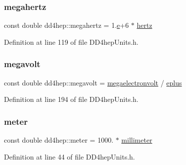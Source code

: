 \hypertarget{namespacedd4hep_a67e1a0f3e5d536a61c5b88820e284f6e}{}\label{namespacedd4hep_a67e1a0f3e5d536a61c5b88820e284f6e} 
\subsubsection{\texorpdfstring{megahertz}{megahertz}}
{\footnotesize\ttfamily const double dd4hep\+::megahertz = 1.\hyperlink{_volumes_8cpp_a8a9a1f93e9b09afccaec215310e64142}{e}+6 $\ast$ \hyperlink{namespacedd4hep_a5ada76b9ea37d13e1e346f2256017cff}{hertz}\hspace{0.3cm}{\ttfamily [static]}}



Definition at line 119 of file D\+D4hep\+Units.\+h.

\hypertarget{namespacedd4hep_a0899b6d1861ddc5f615d06209fb6a9fe}{}\label{namespacedd4hep_a0899b6d1861ddc5f615d06209fb6a9fe} 
\subsubsection{\texorpdfstring{megavolt}{megavolt}}
{\footnotesize\ttfamily const double dd4hep\+::megavolt = \hyperlink{namespacedd4hep_a4e39beba039f7a6bda24a7031c121b2a}{megaelectronvolt} / \hyperlink{namespacedd4hep_a96ccff254b6dcebf179c3630f6205857}{eplus}\hspace{0.3cm}{\ttfamily [static]}}



Definition at line 194 of file D\+D4hep\+Units.\+h.

\hypertarget{namespacedd4hep_a46f5cf0231796af4296a307a58812b06}{}\label{namespacedd4hep_a46f5cf0231796af4296a307a58812b06} 
\subsubsection{\texorpdfstring{meter}{meter}}
{\footnotesize\ttfamily const double dd4hep\+::meter = 1000. $\ast$ \hyperlink{namespacedd4hep_a1b3044c28560621f033b6f0fb9a15854}{millimeter}\hspace{0.3cm}{\ttfamily [static]}}



Definition at line 44 of file D\+D4hep\+Units.\+h.

\hypertarget{namespacedd4hep_afe718b0d811af6b4d45c556e3a0e87a3}{}\label{namespacedd4hep_afe718b0d811af6b4d45c556e3a0e87a3} 
